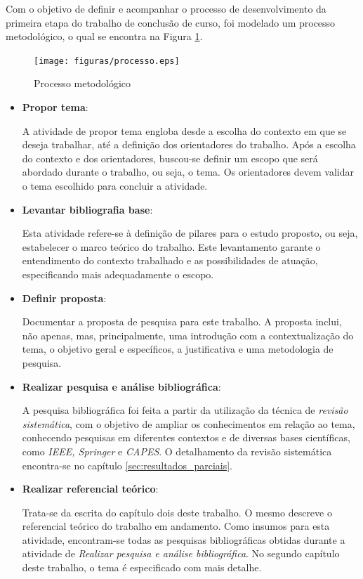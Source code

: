 Com o objetivo de definir e acompanhar o processo de desenvolvimento da primeira etapa do trabalho de conclusão de curso, foi modelado um processo metodológico, o qual se encontra na Figura \ref{img:processo}.

\begin{figure}[H]
	\centering
	\texttt{[image: figuras/processo.eps]}
	\label{img:processo}
	\caption[Processo metodológico]{Processo metodológico}
\end{figure}

\begin{itemize}
	\item \textbf{Propor tema}:

		A atividade de propor tema engloba desde a escolha do contexto em que se deseja trabalhar, até a definição dos orientadores do trabalho. Após a escolha do contexto e dos orientadores, buscou-se definir um escopo que será abordado durante o trabalho, ou seja, o tema. Os orientadores devem validar o tema escolhido para concluir a atividade.

	\item \textbf{Levantar bibliografia base}:

		Esta atividade refere-se à definição de pilares para o estudo proposto, ou seja, estabelecer o marco teórico do trabalho. Este levantamento garante o entendimento do contexto trabalhado e as possibilidades de atuação, especificando mais adequadamente o escopo.

	\item \textbf{Definir proposta}:

		Documentar a proposta de pesquisa para este trabalho. A proposta inclui, não apenas, mas, principalmente, uma introdução com a contextualização do tema, o objetivo geral e específicos, a justificativa e uma metodologia de pesquisa.

	\item \textbf{Realizar pesquisa e análise bibliográfica}:

		A pesquisa bibliográfica foi feita a partir da utilização da técnica de \textit{revisão sistemática}, com o objetivo de ampliar os conhecimentos em relação ao tema, conhecendo pesquisas em diferentes contextos e de diversas bases científicas, como \textit{IEEE, Springer} e \textit{CAPES}. O detalhamento da revisão sistemática encontra-se no capítulo \ref{sec:resultados_parciais}.

	\item \textbf{Realizar referencial teórico}:

		Trata-se da escrita do capítulo dois deste trabalho. O mesmo descreve o referencial teórico do trabalho em andamento. Como insumos para esta atividade, encontram-se todas as pesquisas bibliográficas obtidas durante a atividade de \textit{Realizar pesquisa e análise bibliográfica}. No segundo capítulo deste trabalho, o tema é especificado com mais detalhe.


\end{itemize}
